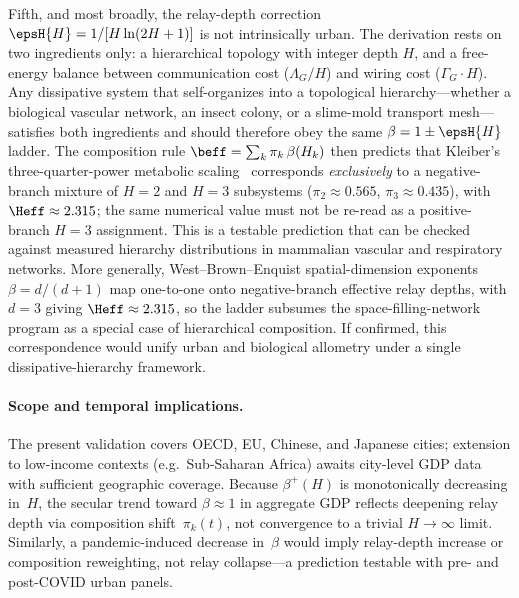 Fifth, and most broadly, the relay-depth correction
$\epsH{H}=1/[H\ln(2H+1)]$ is not intrinsically urban.
The derivation rests on two ingredients only: a hierarchical topology
with integer depth $H$, and a free-energy balance between
communication cost ($\Lambda_G/H$) and wiring cost ($\Gamma_G\cdot H$).
Any dissipative system that self-organizes into a
topological hierarchy---whether a biological vascular network, an
insect colony, or a slime-mold transport mesh---satisfies both
ingredients and should therefore obey the same
$\beta=1\pm\epsH{H}$ ladder.
The composition rule $\beff=\sum_k\pi_k\,\beta(H_k)$
then predicts that Kleiber's three-quarter-power metabolic
scaling~\cite{Kleiber1932,West1997} corresponds \emph{exclusively} to a
negative-branch mixture of $H=2$ and $H=3$ subsystems
($\pi_2\approx 0.565$, $\pi_3\approx 0.435$), with
$\Heff\approx 2.315$; the same numerical value must not be re-read as a
positive-branch $H=3$ assignment. This is a testable prediction that can be
checked against measured hierarchy distributions in mammalian vascular and
respiratory networks.
More generally, West--Brown--Enquist spatial-dimension exponents
$\beta=d/(d+1)$ map one-to-one onto negative-branch effective relay depths,
with $d=3$ giving $\Heff\approx 2.315$, so the ladder subsumes
the space-filling-network program as a special case of hierarchical
composition.
If confirmed, this correspondence would unify urban and biological
allometry under a single dissipative-hierarchy framework.

\paragraph{Scope and temporal implications.}
The present validation covers OECD, EU, Chinese, and Japanese cities;
extension to low-income contexts (e.g.\ Sub-Saharan Africa) awaits
city-level GDP data with sufficient geographic coverage.
Because $\beta^{+}(H)$ is monotonically decreasing in~$H$, the
secular trend toward $\beta\!\approx\!1$ in aggregate GDP reflects
deepening relay depth via composition shift~$\pi_k(t)$, not
convergence to a trivial $H\!\to\!\infty$ limit.
Similarly, a pandemic-induced decrease in~$\beta$ would imply
relay-depth increase or composition reweighting, not relay collapse---a
prediction testable with pre- and post-COVID urban panels.

